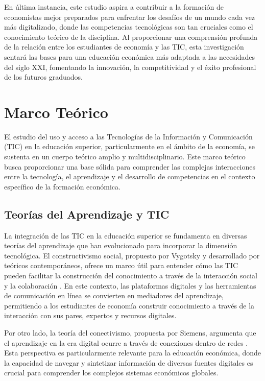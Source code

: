 \documentclass[12pt, a4paper]{article}
\begin{document}
En última instancia, este estudio aspira a contribuir a la formación de economistas mejor preparados para enfrentar los desafíos de un mundo cada vez más digitalizado, donde las competencias tecnológicas son tan cruciales como el conocimiento teórico de la disciplina. Al proporcionar una comprensión profunda de la relación entre los estudiantes de economía y las TIC, esta investigación sentará las bases para una educación económica más adaptada a las necesidades del siglo XXI, fomentando la innovación, la competitividad y el éxito profesional de los futuros graduados.

\section{Marco Teórico}

El estudio del uso y acceso a las Tecnologías de la Información y Comunicación (TIC) en la educación superior, particularmente en el ámbito de la economía, se sustenta en un cuerpo teórico amplio y multidisciplinario. Este marco teórico busca proporcionar una base sólida para comprender las complejas interacciones entre la tecnología, el aprendizaje y el desarrollo de competencias en el contexto específico de la formación económica.

\subsection{Teorías del Aprendizaje y TIC}

La integración de las TIC en la educación superior se fundamenta en diversas teorías del aprendizaje que han evolucionado para incorporar la dimensión tecnológica. El constructivismo social, propuesto por Vygotsky y desarrollado por teóricos contemporáneos, ofrece un marco útil para entender cómo las TIC pueden facilitar la construcción del conocimiento a través de la interacción social y la colaboración \parencite{Siemens2005}. En este contexto, las plataformas digitales y las herramientas de comunicación en línea se convierten en mediadores del aprendizaje, permitiendo a los estudiantes de economía construir conocimiento a través de la interacción con sus pares, expertos y recursos digitales.

Por otro lado, la teoría del conectivismo, propuesta por Siemens, argumenta que el aprendizaje en la era digital ocurre a través de conexiones dentro de redes \parencite{Siemens2005}. Esta perspectiva es particularmente relevante para la educación económica, donde la capacidad de navegar y sintetizar información de diversas fuentes digitales es crucial para comprender los complejos sistemas económicos globales.
\end{document}
